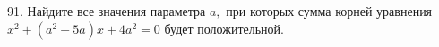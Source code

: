 91. Найдите все значения параметра $a,$ при которых сумма корней уравнения $x^2+(a^2-5a)x+4a^2=0$ будет положительной.\\
